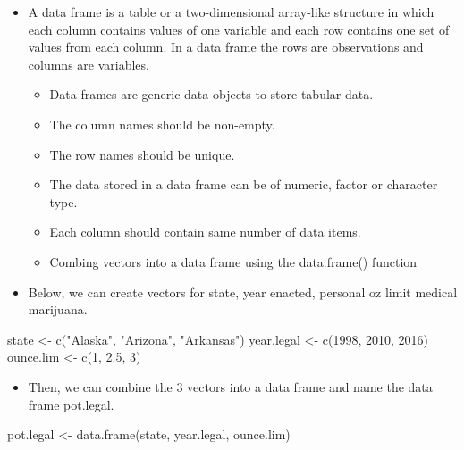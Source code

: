 \documentclass[
  letterpaper,
  DIV=11,
  numbers=noendperiod]{scrreprt}
\newenvironment{Shaded}{\begin{snugshade}}{\end{snugshade}}
\newcommand{\DecValTok}[1]{\textcolor[rgb]{0.68,0.00,0.00}{#1}}
\newcommand{\FloatTok}[1]{\textcolor[rgb]{0.68,0.00,0.00}{#1}}
\newcommand{\FunctionTok}[1]{\textcolor[rgb]{0.28,0.35,0.67}{#1}}
\newcommand{\NormalTok}[1]{\textcolor[rgb]{0.00,0.23,0.31}{#1}}
\newcommand{\OtherTok}[1]{\textcolor[rgb]{0.00,0.23,0.31}{#1}}
\newcommand{\StringTok}[1]{\textcolor[rgb]{0.13,0.47,0.30}{#1}}
\providecommand{\tightlist}{%
  \setlength{\itemsep}{0pt}\setlength{\parskip}{0pt}}\usepackage{longtable,booktabs,array}
\begin{document}
\begin{itemize}
\tightlist
\item
  A data frame is a table or a two-dimensional array-like structure in
  which each column contains values of one variable and each row
  contains one set of values from each column. In a data frame the rows
  are observations and columns are variables.

  \begin{itemize}
  \tightlist
  \item
    Data frames are generic data objects to store tabular data.
  \item
    The column names should be non-empty.
  \item
    The row names should be unique.
  \item
    The data stored in a data frame can be of numeric, factor or
    character type.
  \item
    Each column should contain same number of data items.
  \item
    Combing vectors into a data frame using the data.frame() function
  \end{itemize}
\item
  Below, we can create vectors for state, year enacted, personal oz
  limit medical marijuana.
\end{itemize}

\begin{Shaded}
\begin{Highlighting}[]
\NormalTok{state }\OtherTok{\textless{}{-}} \FunctionTok{c}\NormalTok{(}\StringTok{"Alaska"}\NormalTok{, }\StringTok{"Arizona"}\NormalTok{, }\StringTok{"Arkansas"}\NormalTok{)}
\NormalTok{year.legal }\OtherTok{\textless{}{-}} \FunctionTok{c}\NormalTok{(}\DecValTok{1998}\NormalTok{, }\DecValTok{2010}\NormalTok{, }\DecValTok{2016}\NormalTok{)}
\NormalTok{ounce.lim }\OtherTok{\textless{}{-}} \FunctionTok{c}\NormalTok{(}\DecValTok{1}\NormalTok{, }\FloatTok{2.5}\NormalTok{, }\DecValTok{3}\NormalTok{)}
\end{Highlighting}
\end{Shaded}

\begin{itemize}
\tightlist
\item
  Then, we can combine the 3 vectors into a data frame and name the data
  frame pot.legal.
\end{itemize}

\begin{Shaded}
\begin{Highlighting}[]
\NormalTok{pot.legal }\OtherTok{\textless{}{-}} \FunctionTok{data.frame}\NormalTok{(state, year.legal, ounce.lim)}
\end{Highlighting}
\end{Shaded}
\end{document}
